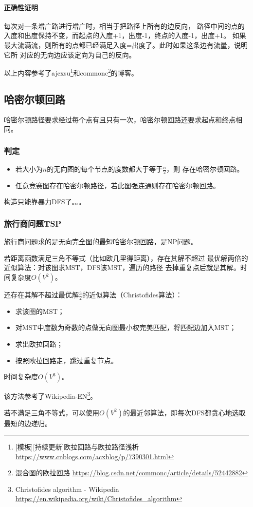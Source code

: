 \paragraph{正确性证明} 每次对一条增广路进行增广时，相当于把路径上所有的边反向，
路径中间的点的入度和出度保持不变，而起点的入度+1，出度-1，终点的入度-1，出度+1。
如果最大流满流，则所有的点都已经满足入度=出度了。此时如果这条边有流量，说明它所
对应的无向边应该定向为自己的反向。

以上内容参考了ajcxsu\footnote{[模板][持续更新]欧拉回路与欧拉路径浅析
    \url{https://www.cnblogs.com/acxblog/p/7390301.html}
}和commonc\footnote{混合图的欧拉回路
    \url{https://blog.csdn.net/commonc/article/details/52442882}
}的博客。
\subsection{哈密尔顿回路}
哈密尔顿路径要求经过每个点有且只有一次，哈密尔顿回路还要求起点和终点相同。

\subsubsection{判定}
\begin{itemize}
    \item \begin{theorem}
        若大小为$n$的无向图的每个节点的度数都大于等于$\frac{n}{2}$，则
        存在哈密尔顿回路。
    \end{theorem}
    \item \begin{theorem}
        任意竞赛图存在哈密尔顿路径，若此图强连通则存在哈密尔顿回路。
    \end{theorem}
\end{itemize}
构造只能靠暴力DFS了。。。
\subsubsection{旅行商问题TSP}
旅行商问题求的是无向完全图的最短哈密尔顿回路，是NP问题。

若距离函数满足三角不等式（比如欧几里得距离），存在其解不超过
最优解两倍的近似算法：对该图求MST，DFS该MST，遍历的路径
去掉重复点后就是其解。时间复杂度$O(V^2)$。

还存在其解不超过最优解$\frac{3}{2}$的近似算法（Christofides算法）：
\begin{itemize}
    \item 求该图的MST；
    \item 对MST中度数为奇数的点做无向图最小权完美匹配，将匹配边加入MST；
    \item 求出欧拉回路；
    \item 按照欧拉回路走，跳过重复节点。
\end{itemize}
时间复杂度$O(V^3)$。

该方法参考了Wikipedia-EN\footnote{Christofides algorithm - Wikipedia\\
    \url{https://en.wikipedia.org/wiki/Christofides\_algorithm}
}。

若不满足三角不等式，可以使用$O(V^2)$的最近邻算法，即每次DFS都贪心地选取
最短的边递归。
